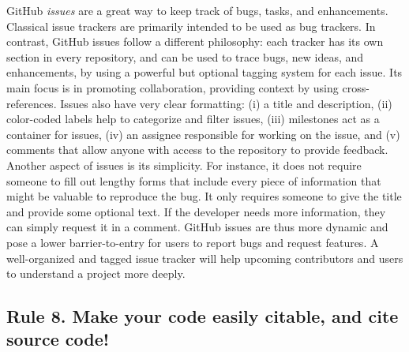 \documentclass[10pt,letterpaper]{article}
\begin{document}
GitHub \emph{issues} are a great way to keep track of bugs, tasks, and
enhancements. Classical issue trackers are primarily intended to be used
as bug trackers. In contrast, GitHub issues follow a different
philosophy: each tracker has its own section in every repository, and
can be used to trace bugs, new ideas, and enhancements, by using a
powerful but optional tagging system for each issue. Its main focus is
in promoting collaboration, providing context by using
cross-references.  Issues also have very clear formatting: (i) a
title and description, (ii) color-coded labels help to categorize and
filter issues, (iii) milestones act as a container for issues, (iv) an
assignee responsible for working on the issue, and (v) comments that
allow anyone with access to the repository to provide feedback. Another
aspect of issues is its simplicity. For instance, it does not require someone to fill
out lengthy forms that include every piece of information that might be
valuable to reproduce the bug. It only requires someone to give the title and
provide some optional text. If the developer needs more information,
they can simply request it in a comment. GitHub issues are thus more
dynamic and pose a lower barrier-to-entry for users to report bugs and request
features. A well-organized and tagged issue tracker will help upcoming
contributors and users to understand a project more deeply.

\subsection*{Rule 8. Make your code easily citable, and cite source
code!}\label{rule-8.-make-your-code-easily-citable-and-cite-source-code}
\end{document}
